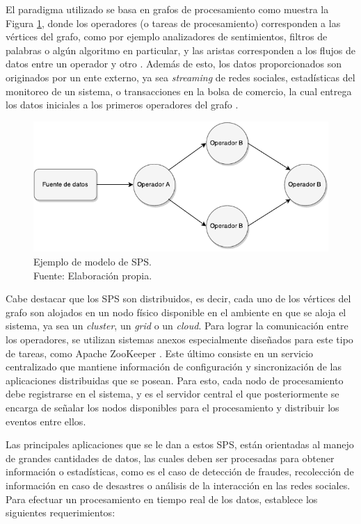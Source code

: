 El paradigma utilizado se basa en grafos de procesamiento como muestra la Figura \ref{fig:grafo}, donde los operadores (o tareas de procesamiento) corresponden a las v\'ertices del grafo, como por ejemplo analizadores de sentimientos, filtros de palabras o alg\'un algoritmo en particular, y las aristas corresponden a los flujos de datos entre un operador y otro \citep{Shahrivari14}. Adem\'as de esto, los datos proporcionados son originados por un ente externo, ya sea \textit{streaming} de redes sociales, estad\'isticas del monitoreo de un sistema, o transacciones en la bolsa de comercio, la cual entrega los datos iniciales a los primeros operadores del grafo \citep{AppelFFB12}.

\begin{figure}[ht!]
  \centering
    \includegraphics[scale=1]{images/SPS.pdf}
  \caption[Ejemplo de modelo de SPS.]{Ejemplo de modelo de SPS.\\Fuente: Elaboraci\'on propia.}
  \label{fig:grafo}
\end{figure}

Cabe destacar que los SPS son distribuidos, es decir, cada uno de los v\'ertices del grafo son alojados en un nodo f\'isico disponible en el ambiente en que se aloja el sistema, ya sea un \textit{cluster}, un \textit{grid} o un \textit{cloud}. Para lograr la comunicaci\'on entre los operadores, se utilizan sistemas anexos especialmente dise\~nados para este tipo de tareas, como Apache ZooKeeper \citep{HuntKJR10}. Este \'ultimo consiste en un servicio centralizado que mantiene informaci\'on de configuraci\'on y sincronizaci\'on de las aplicaciones distribuidas que se posean. \normalsize{Para esto, cada nodo de procesamiento debe registrarse en el sistema, y es el servidor central el que posteriormente se encarga de se\~nalar los nodos disponibles para el procesamiento y distribuir los eventos entre ellos.}

Las principales aplicaciones que se le dan a estos SPS, est\'an orientadas al manejo de grandes cantidades de datos, las cuales deben ser procesadas para obtener informaci\'on o estad\'isticas, como es el caso de detecci\'on de fraudes, recolecci\'on de informaci\'on en caso de desastres o an\'alisis de la interacci\'on en las redes sociales. Para efectuar un procesamiento en tiempo real de los datos, \citep{StonebrakerCZ05} establece los siguientes requerimientos:

